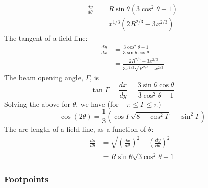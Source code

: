 \documentclass{article}
\newcommand{\deriv}[2]{\frac{d{#1}}{d{#2}}}
\begin{document}
\begin{equation}
    \begin{aligned}
        \deriv{y}{\theta} &= R\sin\theta(3\cos^2\theta - 1) \\
                          &= x^{1/3}(2R^{2/3} - 3x^{2/3})
    \end{aligned}
\end{equation}
The tangent of a field line:
\begin{equation}
    \begin{aligned}
        \deriv{y}{x} &= \frac{3\cos^2\theta-1}{3\sin\theta\cos\theta} \\
                     &= \frac{2R^{2/3} - 3x^{2/3}}{3x^{1/3}\sqrt{R^{2/3} - x^{2/3}}}
    \end{aligned}
\end{equation}
The beam opening angle, $\Gamma$, is
\begin{equation}
    \tan\Gamma = \deriv{x}{y} = \frac{3\sin\theta\cos\theta}{3\cos^2\theta-1}
\end{equation}
Solving the above for $\theta$, we have (for $-\pi \le \Gamma \le \pi$)
\begin{equation}
    \cos(2\theta) = \frac13 \left(\cos\Gamma\sqrt{8+\cos^2\Gamma} - \sin^2\Gamma\right)
\end{equation}
The arc length of a field line, as a function of $\theta$:
\begin{equation}
    \begin{aligned}
        \deriv{s}{\theta} &= \sqrt{\left(\deriv{x}{\theta}\right)^2 + \left(\deriv{y}{\theta}\right)^2} \\
                          &= R\sin\theta \sqrt{3\cos^2\theta + 1}
    \end{aligned}
\end{equation}

\subsubsection{Footpoints}
\end{document}
